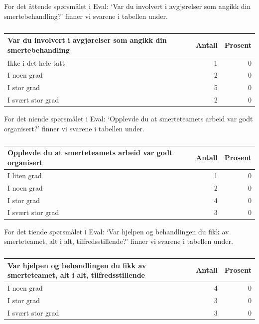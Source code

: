 \documentclass[
]{article}
\begin{document}
For det åttende spørsmålet i Eval: `Var du involvert i avgjørelser som
angikk din smertebehandling?' finner vi svarene i tabellen under.

\begin{table}

\caption{\label{tab:evalu}}
\centering
\begin{tabular}[t]{l|r|r}
\hline
Var du involvert i avgjørelser som angikk din smertebehandling & Antall  & Prosent\\
\hline
Ikke i det hele tatt & 1 & 0\\
\hline
I noen grad & 2 & 0\\
\hline
I stor grad & 5 & 0\\
\hline
I svært stor grad & 2 & 0\\
\hline
\end{tabular}
\end{table}

For det niende spørsmålet i Eval: `Opplevde du at smerteteamets arbeid
var godt organisert?' finner vi svarene i tabellen under.

\begin{table}

\caption{\label{tab:evalu}}
\centering
\begin{tabular}[t]{l|r|r}
\hline
Opplevde du at smerteteamets arbeid var godt organisert & Antall  & Prosent\\
\hline
I liten grad & 1 & 0\\
\hline
I noen grad & 2 & 0\\
\hline
I stor grad & 4 & 0\\
\hline
I svært stor grad & 3 & 0\\
\hline
\end{tabular}
\end{table}

For det tiende spørsmålet i Eval: `Var hjelpen og behandlingen du fikk
av smerteteamet, alt i alt, tilfredsstillende?' finner vi svarene i
tabellen under.

\begin{table}

\caption{\label{tab:evalu}}
\centering
\begin{tabular}[t]{l|r|r}
\hline
Var hjelpen og behandlingen du fikk av smerteteamet, alt i alt, tilfredsstillende & Antall  & Prosent\\
\hline
I noen grad & 4 & 0\\
\hline
I stor grad & 3 & 0\\
\hline
I svært stor grad & 3 & 0\\
\hline
\end{tabular}
\end{table}
\end{document}
